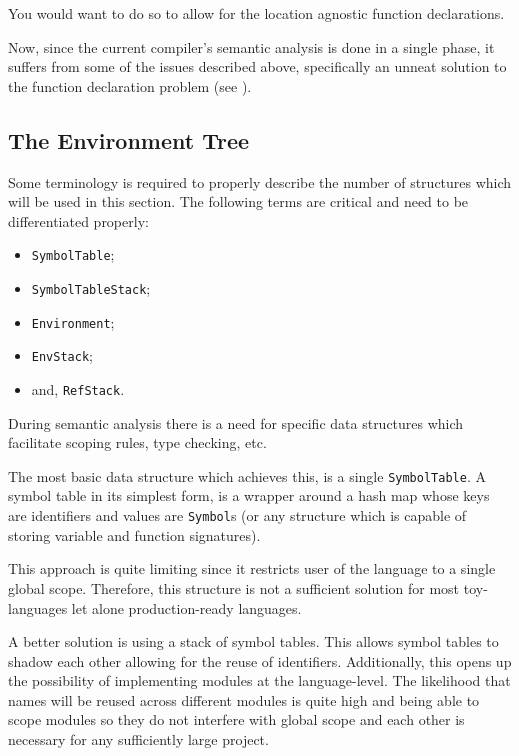 You would want to do so to allow for the location agnostic
function declarations.

Now, since the current compiler's semantic analysis is done in a
single phase, it suffers from some of the issues described
above, specifically an unneat solution to the function
declaration problem (see ).

\subsection{The Environment Tree}

Some terminology is required to properly describe the number of
structures which will be used in this section. The following
terms are critical and need to be differentiated properly:

\begin{itemize}
    \item \texttt{SymbolTable};
    \item \texttt{SymbolTableStack};
    \item \texttt{Environment};
    \item \texttt{EnvStack};
    \item and, \texttt{RefStack}.
\end{itemize}

During semantic analysis there is a need for specific data
structures which facilitate scoping rules, type checking, etc.

The most basic data structure which achieves this, is a single
\texttt{SymbolTable}. A symbol table in its simplest form, is a
wrapper around a hash map whose keys are identifiers and values
are \texttt{Symbol}s (or any structure which is capable of
storing variable and function signatures).

This approach is quite limiting since it restricts user of the
language to a single global scope. Therefore, this structure is
not a sufficient solution for most toy-languages let alone
production-ready languages.

A better solution is using a stack of symbol tables. This allows
symbol tables to shadow each other allowing for the reuse of
identifiers. Additionally, this opens up the possibility of
implementing modules at the language-level. The likelihood that
names will be reused across different modules is quite high and
being able to scope modules so they do not interfere with global
scope and each other is necessary for any sufficiently large
project.

